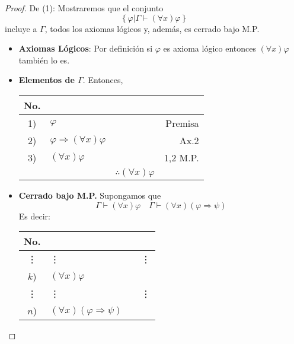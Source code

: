 \documentclass[12pt]{report}
\newcounter{it}
\theoremstyle{largebreak}
\begin{document}
    \begin{proof}
        De (1): Mostraremos que el conjunto
        \begin{equation*}
            \left\{\varphi\Big|\Gamma\vdash(\forall x)\varphi \right\}
        \end{equation*}
        incluye a $\Gamma$, todos los axiomas lógicos y, además, es cerrado bajo M.P.
        \begin{itemize}
            \item \textbf{Axiomas Lógicos}: Por definición si $\varphi$ es axioma lógico entonces $(\forall x)\varphi$ también lo es.
            \item \textbf{Elementos de $\Gamma$}. Entonces,
            \begin{center}
                \begin{tabular}{ c  l  l  r  }
                    \hline
                    No. &  &  &  \\
                    \hline
                    1) & $\varphi$ &  & Premisa \\
                    2) & $\varphi\Rightarrow(\forall x)\varphi$ &  & Ax.2  \\
                    3) & $(\forall x)\varphi$ &  & 1,2 M.P.  \\
                    \hline
                      &  &  $\therefore(\forall x)\varphi$ &  \\
                \end{tabular}
            \end{center}
            \item \textbf{Cerrado bajo M.P.} Supongamos que
            \begin{equation*}
                \Gamma\vdash(\forall x)\varphi\quad\Gamma\vdash(\forall x)(\varphi\Rightarrow\psi)
            \end{equation*}
            Es decir:
            \begin{center}
                \begin{tabular}{ c  l  l  r  }
                    \hline
                    No. &  &  &  \\
                    \hline
                    \vdots & \vdots  &  & \vdots  \\
                    $k$) & $(\forall x)\varphi$ &  &   \\
                    \vdots & \vdots  &  & \vdots  \\
                    $n$) & $(\forall x)(\varphi\Rightarrow\psi)$ &  &   \\

\end{tabular}
\end{center}
\end{itemize}
\end{proof}
\end{document}
